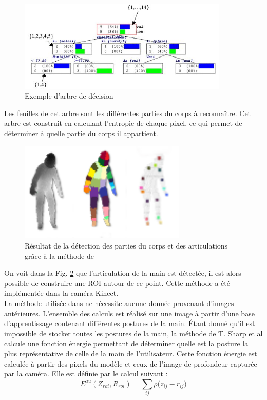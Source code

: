\begin{figure}[!h]
   \begin{center}
     \includegraphics[width=10cm]{images/Arbre_de_decision.jpg}
     \caption{Exemple d'arbre de décision}
     \label{fig:arbre}
   \end{center}
 \end{figure}

Les feuilles de cet arbre sont les différentes parties du corps à reconnaître. Cet arbre est construit en calculant
l'entropie de chaque pixel, ce qui permet de déterminer à quelle partie du corps il appartient.\\

\begin{figure}[!h]
 \begin{center}
  \includegraphics[width=300px]{images/bodyrecognition.png}
  \caption{Résultat de la détection des parties du corps et des articulations grâce à la méthode de \cite{export:145347}}
  \label{fig:bodyrecognition}
 \end{center}
\end{figure}

On voit dans la Fig. \ref{fig:bodyrecognition} que l'articulation de la main est détectée, il est alors possible de construire
une ROI autour de ce point. Cette méthode a été implémentée dans la caméra Kinect.\\

La méthode utilisée dans \cite{export:238453} ne nécessite aucune donnée provenant d'images antérieures. L'ensemble
des calculs est réalisé sur une image à partir d'une base d'apprentissage contenant différentes postures de la
main. \'{E}tant donné qu'il est impossible de stocker toutes les postures de la main, la méthode de T. Sharp et al \cite{export:238453}
calcule une fonction énergie permettant de déterminer quelle est la posture la plus représentative de celle de la main
de l'utilisateur. Cette fonction énergie est calculée à partir des pixels du modèle et ceux de l'image de profondeur
capturée par la caméra. Elle est définie par le calcul suivant :
\begin{equation}
 E^{au}(Z_{roi}, R_{roi}) = \sum_{ij} \bar{\rho(z_{ij}} - r_{ij})
\end{equation}


